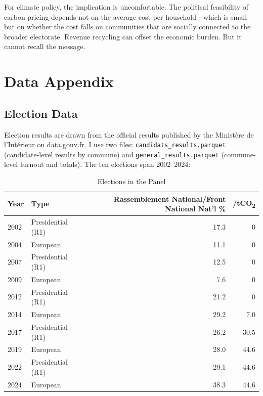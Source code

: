 \documentclass[12pt]{article}
\providecommand{\euro}{\texteuro}
\newcommand{\rn}{Rassemblement National}
\newcommand{\fn}{Front National}
\begin{document}
For climate policy, the implication is uncomfortable. The political feasibility of carbon pricing depends not on the average cost per household---which is small---but on whether the cost falls on communities that are socially connected to the broader electorate. Revenue recycling can offset the economic burden. But it cannot recall the message.

\label{apep_main_text_end}






\clearpage
\appendix
\setcounter{table}{0}
\renewcommand{\thetable}{A\arabic{table}}
\setcounter{figure}{0}
\renewcommand{\thefigure}{A\arabic{figure}}

\section{Data Appendix}
\label{app:data}

\subsection{Election Data}

Election results are drawn from the official results published by the Minist\`{e}re de l'Int\'{e}rieur on data.gouv.fr. I use two files: \texttt{candidats\_results.parquet} (candidate-level results by commune) and \texttt{general\_results.parquet} (commune-level turnout and totals). The ten elections span 2002--2024:

\begin{table}[H]
\centering
\caption{Elections in the Panel}
\label{tab:elections}
\small
\begin{tabular}{@{}llrr@{}}
\toprule
Year & Type & \rn{}/\fn{} Nat'l \% & \euro/tCO\textsubscript{2} \\
\midrule
2002 & Presidential (R1) & 17.3 & 0 \\
2004 & European & 11.1 & 0 \\
2007 & Presidential (R1) & 12.5 & 0 \\
2009 & European & 7.6 & 0 \\
2012 & Presidential (R1) & 21.2 & 0 \\
2014 & European & 29.2 & 7.0 \\
2017 & Presidential (R1) & 26.2 & 30.5 \\
2019 & European & 28.0 & 44.6 \\
2022 & Presidential (R1) & 29.1 & 44.6 \\
2024 & European & 38.3 & 44.6 \\
\bottomrule
\end{tabular}
\end{table}
\end{document}
